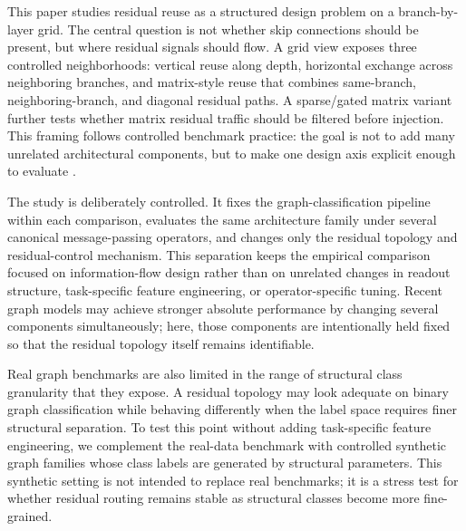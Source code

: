 This paper studies residual reuse as a structured design problem on a branch-by-layer grid. The central question is not whether skip connections should be present, but where residual signals should flow. A grid view exposes three controlled neighborhoods: vertical reuse along depth, horizontal exchange across neighboring branches, and matrix-style reuse that combines same-branch, neighboring-branch, and diagonal residual paths. A sparse/gated matrix variant further tests whether matrix residual traffic should be filtered before injection. This framing follows controlled benchmark practice: the goal is not to add many unrelated architectural components, but to make one design axis explicit enough to evaluate \cite{keriven2020benchmark,morris2020tudataset}.

The study is deliberately controlled. It fixes the graph-classification pipeline within each comparison, evaluates the same architecture family under several canonical message-passing operators, and changes only the residual topology and residual-control mechanism. This separation keeps the empirical comparison focused on information-flow design rather than on unrelated changes in readout structure, task-specific feature engineering, or operator-specific tuning. Recent graph models may achieve stronger absolute performance by changing several components simultaneously; here, those components are intentionally held fixed so that the residual topology itself remains identifiable.

Real graph benchmarks are also limited in the range of structural class granularity that they expose. A residual topology may look adequate on binary graph classification while behaving differently when the label space requires finer structural separation. To test this point without adding task-specific feature engineering, we complement the real-data benchmark with controlled synthetic graph families whose class labels are generated by structural parameters. This synthetic setting is not intended to replace real benchmarks; it is a stress test for whether residual routing remains stable as structural classes become more fine-grained.

